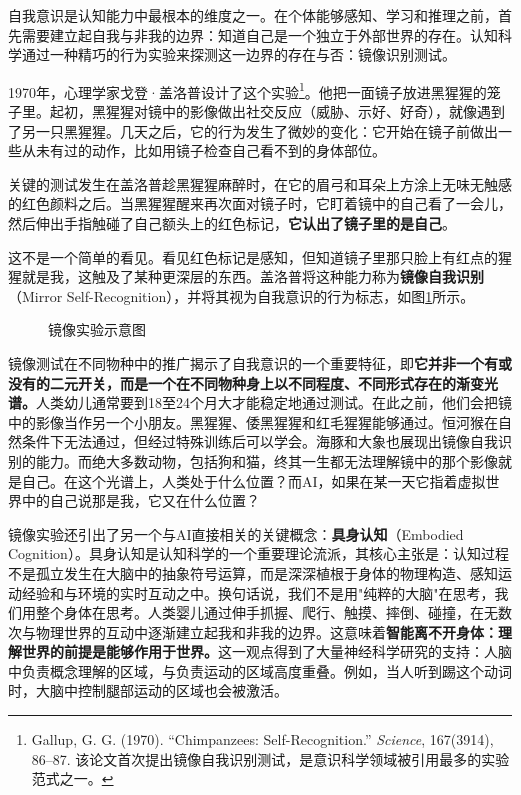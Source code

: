 自我意识是认知能力中最根本的维度之一。在个体能够感知、学习和推理之前，首先需要建立起自我与非我的边界：知道自己是一个独立于外部世界的存在。认知科学通过一种精巧的行为实验来探测这一边界的存在与否：镜像识别测试。

1970年，心理学家戈登·盖洛普设计了这个实验\footnote{Gallup, G. G. (1970). ``Chimpanzees: Self-Recognition.'' \emph{Science}, 167(3914), 86--87. 该论文首次提出镜像自我识别测试，是意识科学领域被引用最多的实验范式之一。}。他把一面镜子放进黑猩猩的笼子里。起初，黑猩猩对镜中的影像做出社交反应（威胁、示好、好奇），就像遇到了另一只黑猩猩。几天之后，它的行为发生了微妙的变化：它开始在镜子前做出一些从未有过的动作，比如用镜子检查自己看不到的身体部位。

关键的测试发生在盖洛普趁黑猩猩麻醉时，在它的眉弓和耳朵上方涂上无味无触感的红色颜料之后。当黑猩猩醒来再次面对镜子时，它盯着镜中的自己看了一会儿，然后伸出手指触碰了自己额头上的红色标记，\textbf{它认出了镜子里的是自己}。

这不是一个简单的看见。看见红色标记是感知，但知道镜子里那只脸上有红点的猩猩就是我，这触及了某种更深层的东西。盖洛普将这种能力称为\textbf{镜像自我识别}（Mirror Self-Recognition），并将其视为自我意识的行为标志，如图\ref{fig:ch1_01}所示。

\begin{figure}[htbp]
\centering
{}
\caption{镜像实验示意图}
\label{fig:ch1_01}
\end{figure}

镜像测试在不同物种中的推广揭示了自我意识的一个重要特征，即\textbf{它并非一个有或没有的二元开关，而是一个在不同物种身上以不同程度、不同形式存在的渐变光谱。}人类幼儿通常要到18至24个月大才能稳定地通过测试。在此之前，他们会把镜中的影像当作另一个小朋友。黑猩猩、倭黑猩猩和红毛猩猩能够通过。恒河猴在自然条件下无法通过，但经过特殊训练后可以学会。海豚和大象也展现出镜像自我识别的能力。而绝大多数动物，包括狗和猫，终其一生都无法理解镜中的那个影像就是自己。在这个光谱上，人类处于什么位置？而AI，如果在某一天它指着虚拟世界中的自己说那是我，它又在什么位置？

镜像实验还引出了另一个与AI直接相关的关键概念：\textbf{具身认知}（Embodied Cognition）。具身认知是认知科学的一个重要理论流派，其核心主张是：认知过程不是孤立发生在大脑中的抽象符号运算，而是深深植根于身体的物理构造、感知运动经验和与环境的实时互动之中。换句话说，我们不是用"纯粹的大脑"在思考，我们用整个身体在思考。人类婴儿通过伸手抓握、爬行、触摸、摔倒、碰撞，在无数次与物理世界的互动中逐渐建立起我和非我的边界。这意味着\textbf{智能离不开身体：理解世界的前提是能够作用于世界。}这一观点得到了大量神经科学研究的支持：人脑中负责概念理解的区域，与负责运动的区域高度重叠。例如，当人听到踢这个动词时，大脑中控制腿部运动的区域也会被激活。

